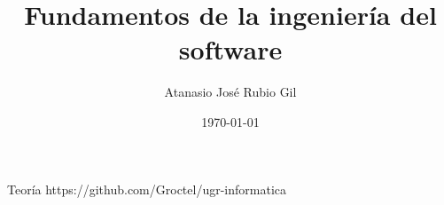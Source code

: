\documentclass[10pt]{report}
\author{Atanasio José Rubio Gil}
\title{Fundamentos de la ingeniería del software}
\date{\today}
\begin{document}
            {Teoría}
            {https://github.com/Groctel/ugr-informatica}
\tableofcontents

% 
\end{document}
